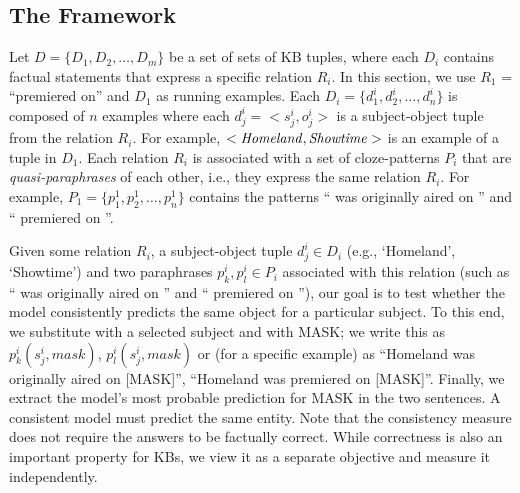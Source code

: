 \subsection{The Framework}
\label{sec:framework}
Let
$D = \{D_1, D_2,
\dots, D_m\}$
be a set of sets of KB tuples,
where each $D_i$ contains factual statements
that express a specific relation $R_i$. In this section, we
use $R_1$ = ``premiered
on'' and $D_1$
as running examples. Each $D_i=\{d_1^i,
d_2^i, \dots, d_n^i\}$
is composed of $n$ examples  where each $d_j^i = <s_j^i,o_j^i>$
is a subject-object tuple from the relation $R_i$. 
For example,
$<\text{\textit{Homeland}},
\text{\textit{Showtime}}>$
is an example of a 
tuple in $D_1$.
Each relation $R_i$ is associated with a set of
cloze-patterns $P_i$ that are \textit{quasi-paraphrases} of
each other, i.e., they express the same relation $R_i$. For example, $P_1=\{p_1^1, p_2^1, \dots, p_n^1\}$ contains the patterns ``\subj{} was originally aired on \obj{}'' and ``\subj{} premiered on \obj{}''.

Given some relation $R_i$, a subject-object tuple $d_j^i \in
D_i$ (e.g., `Homeland', `Showtime') and two paraphrases
$p_k^i, p_l^i \in P_i$ associated with this relation (such
as ``\subj{} was originally aired on \obj{}'' and ``\subj{}
premiered on \obj{}''), our goal is to test whether the
model consistently predicts the same object for a particular subject.
To this end, we
substitute \subj{} with a selected subject and \obj{} with
MASK; we write this as $p_k^i(s_j^i,mask)$,
$p_l^i(s_j^i,mask)$ or (for a specific example) as
``Homeland was originally aired on [MASK]'', ``Homeland was premiered on [MASK]''.
Finally, we extract the model's most probable prediction for
MASK in the two sentences.  A consistent model must predict
the same entity. Note that the consistency measure does not
require the answers to be factually correct. While
correctness is also an important property for KBs, we view
it as a separate objective and measure it independently. 

